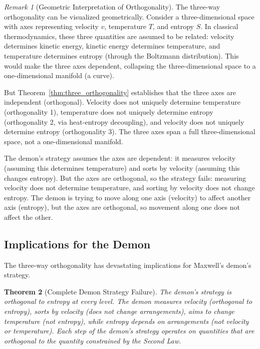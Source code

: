 \documentclass[12pt,a4paper]{article}
\newtheorem{theorem}{Theorem}[section]
\theoremstyle{definition}
\theoremstyle{remark}
\newtheorem{remark}[theorem]{Remark}
\begin{document}
\begin{remark}[Geometric Interpretation of Orthogonality]
\label{rem:geometric_orthogonality}
The three-way orthogonality can be visualized geometrically. Consider a three-dimensional space with axes representing velocity $v$, temperature $T$, and entropy $S$. In classical thermodynamics, these three quantities are assumed to be related: velocity determines kinetic energy, kinetic energy determines temperature, and temperature determines entropy (through the Boltzmann distribution). This would make the three axes dependent, collapsing the three-dimensional space to a one-dimensional manifold (a curve).

But Theorem~\ref{thm:three_orthogonality} establishes that the three axes are independent (orthogonal). Velocity does not uniquely determine temperature (orthogonality 1), temperature does not uniquely determine entropy (orthogonality 2, via heat-entropy decoupling), and velocity does not uniquely determine entropy (orthogonality 3). The three axes span a full three-dimensional space, not a one-dimensional manifold.

The demon's strategy assumes the axes are dependent: it measures velocity (assuming this determines temperature) and sorts by velocity (assuming this changes entropy). But the axes are orthogonal, so the strategy fails: measuring velocity does not determine temperature, and sorting by velocity does not change entropy. The demon is trying to move along one axis (velocity) to affect another axis (entropy), but the axes are orthogonal, so movement along one does not affect the other.
\end{remark}

\subsection{Implications for the Demon}

The three-way orthogonality has devastating implications for Maxwell's demon's strategy.

\begin{theorem}[Complete Demon Strategy Failure]
\label{thm:complete_failure}
The demon's strategy is orthogonal to entropy at every level. The demon measures velocity (orthogonal to entropy), sorts by velocity (does not change arrangements), aims to change temperature (not entropy), while entropy depends on arrangements (not velocity or temperature). Each step of the demon's strategy operates on quantities that are orthogonal to the quantity constrained by the Second Law.
\end{theorem}
\end{document}
